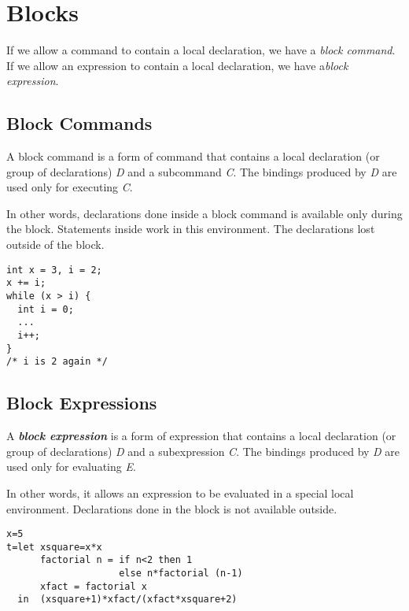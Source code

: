 \newpage
\section{Blocks}
\label{sec:blocks}

If we allow a command to contain a local declaration, we have a \textit{block command}. If we allow an expression to contain a local declaration, we have a\textit{block expression}.

\subsection{Block Commands}

A block command is a form of command that contains a local declaration (or group of declarations) \textit{D} and a subcommand \textit{C}. The bindings produced by \textit{D} are used only for executing \textit{C}.

In other words, declarations done inside a block command is available only during the block. Statements inside work in this environment. The declarations lost outside of the block.

\begin{listing}[H]
\begin{verbatim}
int x = 3, i = 2;
x += i;
while (x > i) {
  int i = 0;
  ...
  i++;
}
/* i is 2 again */
\end{verbatim}
\caption{}
\label{code:code7}
\end{listing}


\subsection{Block Expressions}

A \textit{\textbf{block expression}} is a form of expression that contains a local declaration (or group of declarations) \textit{D} and a subexpression \textit{C}. The bindings produced by \textit{D} are used only for evaluating \textit{E}.

In other words, it allows an expression to be evaluated in a special local environment. Declarations done in the block is not available outside.

\begin{listing}[H]
\begin{verbatim}
x=5
t=let xsquare=x*x
      factorial n = if n<2 then 1
                    else n*factorial (n-1)
      xfact = factorial x
  in  (xsquare+1)*xfact/(xfact*xsquare+2)
\end{verbatim}
\caption{}
\label{code:code8}
\end{listing}


